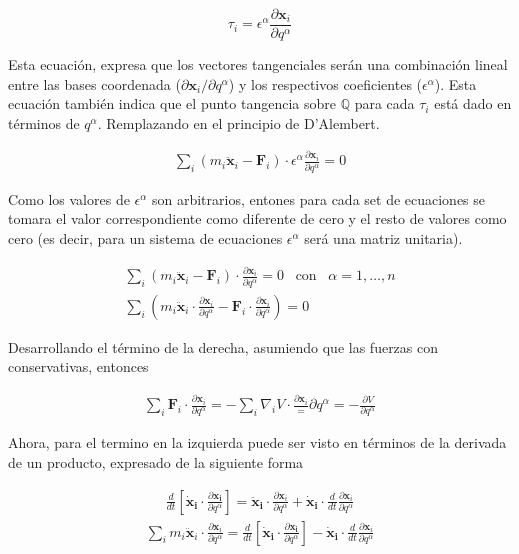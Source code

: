     \begin{equation*}
        \tau_i = \epsilon^{\alpha} \frac{\partial \mathbf{x}_i}{\partial q^{\alpha}}
    \end{equation*}

Esta ecuación, expresa que los vectores tangenciales serán una combinación lineal entre las bases coordenada ($\partial \mathbf{x}_i / \partial q^{\alpha}$) y los respectivos coeficientes ($\epsilon^{\alpha}$). Esta ecuación también indica que el punto tangencia sobre $\mathbb{Q}$ para cada $\tau_i$ está dado en términos de $q^{\alpha}$. Remplazando en el principio de D'Alembert.

    \begin{gather*}
        \sum_i (m_i\ddot{\mathbf{x}}_i - \mathbf{F}_i) \cdot \epsilon^{\alpha} \frac{\partial \mathbf{x}_i}{\partial q^{\alpha}} = 0
    \end{gather*}

    Como los valores de $\epsilon^{\alpha}$ son arbitrarios, entones para cada set de ecuaciones se tomara el valor correspondiente como diferente de cero y el resto de valores como cero (es decir, para un sistema de ecuaciones $\epsilon^{\alpha}$ será una matriz unitaria).

    \begin{gather*}
        \sum_i (m_i\ddot{\mathbf{x}}_i - \mathbf{F}_i) \cdot  \frac{\partial \mathbf{x}_i}{\partial q^{\alpha}} = 0 \;\;\; \text{con} \;\;\; \alpha = 1, \dots, n\\
        \sum_i \left(m_i\ddot{\mathbf{x}}_i\cdot  \frac{\partial \mathbf{x}_i}{\partial q^{\alpha}} - \mathbf{F}_i \cdot  \frac{\partial \mathbf{x}_i}{\partial q^{\alpha}}\right)  = 0
    \end{gather*}

    Desarrollando el término de la derecha, asumiendo que las fuerzas con conservativas, entonces 

    \begin{gather*}
        \sum_i \mathbf{F}_i \cdot  \frac{\partial \mathbf{x}_i}{\partial q^{\alpha}} =  - \sum_i \nabla_i V\cdot  \frac{\partial \mathbf{x}_i} ={\partial q^{\alpha}} = - \frac{\partial V}{\partial q^{\alpha}}
    \end{gather*}

    Ahora, para el termino en la izquierda puede ser visto en términos de la derivada de un producto, expresado de la siguiente forma

    \begin{gather*}
        \frac{d}{dt}\left[\mathbf{\dot{x}_i} \cdot  \frac{\partial \mathbf{x_i}}{\partial q^{\alpha}}\right] = \mathbf{\ddot{x}_i} \cdot \frac{\partial \mathbf{x}_i}{\partial q^{\alpha}} + \mathbf{\dot{x}_i} \cdot \frac{d}{dt}\frac{\partial \mathbf{x}_i}{\partial q^{\alpha}}
    \end{gather*}
    \begin{gather*}
        \sum_i m_i\ddot{\mathbf{x}}_i\cdot  \frac{\partial \mathbf{x}_i} {\partial q^{\alpha}} = \frac{d}{dt}\left[\mathbf{\dot{x}_i} \cdot  \frac{\partial \mathbf{x_i}}{\partial q^{\alpha}}\right] - \mathbf{\dot{x}_i} \cdot \frac{d}{dt}\frac{\partial \mathbf{x}_i}{\partial q^{\alpha}}
    \end{gather*}


